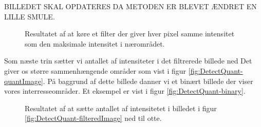 BILLEDET SKAL OPDATERES DA METODEN ER BLEVET ÆNDRET EN LILLE SMULE.
\begin{figure}[htp]
  \centering
  \caption{Resultatet af at køre et filter der giver hver pixel samme intensitet som den maksimale intensitet i nærområdet.}
  \label{fig:DetectQuant-filteredImage}  
\end{figure}

Som næste trin sætter vi antallet af intensiteter i det filtrerede billede ned Det giver os større sammenhængende områder som vist i figur \vref{fig:DetectQuant-quantImage}. På baggrund af dette billede danner vi et binært billede der viser vores interresseområder. Et eksempel er vist i figur \vref{fig:DetectQuant-binary}.

\begin{figure}[htp]
  \centering
  \caption{Resultatet af at sætte antallet af intensitetet i billedet i figur \vref{fig:DetectQuant-filteredImage} ned til otte.}
  \label{fig:DetectQuant-quantImage}  
\end{figure}

